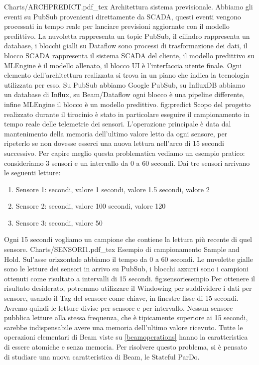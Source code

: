 {Charts/ARCHPREDICT.pdf_tex}
{Architettura sistema previsionale. Abbiamo gli eventi su PubSub provenienti direttamente da SCADA, questi eventi vengono processati in tempo reale per lanciare previsioni aggiornate con il modello predittivo. La nuvoletta rappresenta un topic PubSub, il cilindro rappresenta un database, i blocchi gialli su Dataflow sono processi di trasformazione dei dati, il blocco SCADA rappresenta il sistema SCADA del cliente, il modello predittivo su MLEngine è il modello allenato, il blocco UI è l'interfaccia utente finale. Ogni elemento dell'architettura realizzata si trova in un piano che indica la tecnologia utilizzata per esso. Su PubSub abbiamo Google PubSub, su InfluxDB abbiamo un database di Influx, su Beam/Dataflow ogni blocco è una pipeline differente, infine MLEngine il blocco è un modello predittivo.}
{fig:predict}
Scopo del progetto realizzato durante il tirocinio è stato in particolare eseguire il campionamento in tempo reale delle telemetrie dei sensori. L'operazione principale è data dal mantenimento della memoria dell'ultimo valore letto da ogni sensore, per ripeterlo se non dovesse esserci una nuova lettura nell'arco di 15 secondi successivo.
Per capire meglio questa problematica vediamo un esempio pratico: consideriamo 3 sensori e un intervallo da 0 a 60 secondi. Dai tre sensori arrivano le seguenti letture:
\begin{enumerate}
	\item Sensore 1:
	 secondi, valore 1
	 secondi, valore 1.5
	 secondi, valore 2
	\item  Sensore 2:
	 secondi, valore 100
	 secondi, valore 120
	\item Sensore 3:
	 secondi, valore 50 
\end{enumerate}
Ogni 15 secondi vogliamo un campione che contiene la lettura più recente di quel sensore.
\svg
{Charts/SENSORI1.pdf_tex}
{Esempio di campionamento Sample and Hold. Sul'asse orizzontale abbiamo il tempo da 0 a 60 secondi. Le nuvolette gialle sono le letture dei sensori in arrivo su PubSub, i blocchi azzurri sono i campioni ottenuti come risultato a intervalli di 15 secondi.}
{fig:sensoriesempio}
Per ottenere il risultato desiderato, potremmo utilizzare il Windowing per suddividere i dati per sensore, usando il Tag del sensore come chiave, in finestre fisse di 15 secondi. Avremo quindi le letture divise per sensore e per intervallo. Nessun sensore pubblica letture alla stessa frequenza, che è tipicamente superiore ai 15 secondi, sarebbe indispensabile avere una memoria dell'ultimo valore ricevuto. Tutte le operazioni elementari di Beam viste su \ref{beamoperations} hanno la caratteristica di essere atomiche e senza memoria. Per risolvere questo problema, si è pensato di studiare una nuova caratteristica di Beam, le Stateful ParDo.
